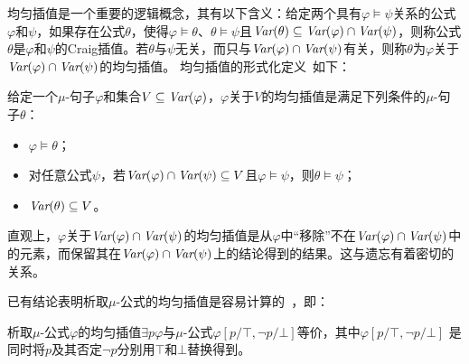 均匀插值是一个重要的逻辑概念，其有以下含义：给定两个具有$\varphi\models\psi$关系的公式$\varphi$和$\psi$，如果存在公式$\theta$，使得$\varphi\models \theta$、$\theta \models \psi$且$\textit{Var}(\theta) \subseteq \textit{Var}(\varphi) \cap \textit{Var}(\psi)$，则称公式$\theta$是$\varphi$和$\psi$的Craig插值。若$\theta$与$\psi$无关，而只与$\textit{Var}(\varphi) \cap \textit{Var}(\psi)$有关，则称$\theta$为$\varphi$关于$\textit{Var}(\varphi) \cap \textit{Var}(\psi)$的均匀插值。
均匀插值的形式化定义~\cite{d2006modal}如下：%
\begin{definition}
	给定一个$\mu$-句子$\varphi$和集合$V\subseteq \textit{Var}(\varphi)$，$\varphi$关于$V$的均匀插值是满足下列条件的$\mu$-句子$\theta$：
	\begin{itemize}
		\item $\varphi \models \theta$；
		\item 对任意公式$\psi$，若$\textit{Var}(\varphi) \cap \textit{Var}(\psi)\subseteq V$且$\varphi \models \psi$，则$\theta \models \psi$；
		\item $\textit{Var}(\theta) \subseteq V$。 
	\end{itemize}
\end{definition}


直观上，$\varphi$关于$\textit{Var}(\varphi) \cap \textit{Var}(\psi)$的均匀插值是从$\varphi$中“移除”不在$\textit{Var}(\varphi) \cap \textit{Var}(\psi)$中的元素，而保留其在$\textit{Var}(\varphi) \cap \textit{Var}(\psi)$上的结论得到的结果。这与遗忘有着密切的关系。

已有结论表明析取$\mu$-公式的均匀插值是容易计算的~\cite{d2006modal}，即：
\begin{theorem}%
	析取$\mu$-公式$\varphi$的均匀插值$\exists p \varphi$与$\mu$-公式$\varphi[p/\top, \neg p/ \bot]$等价，其中$\varphi[p/\top, \neg p/ \bot]$ 是同时将$p$及其否定$\neg p$分别用$\top$和$\bot$替换得到。
\end{theorem}




